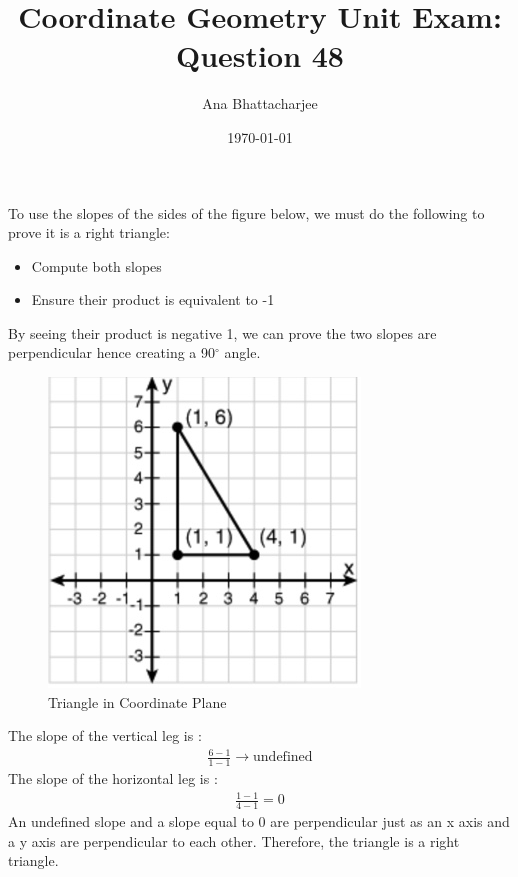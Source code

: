 \documentclass{article}
\begin{document}
\title{Coordinate Geometry Unit Exam: Question 48}
\author{Ana Bhattacharjee}
\date{\today}
\maketitle{}

\begin{center}
To use the slopes of the sides of the figure below, we must do the following to prove it is a right triangle:
\begin{itemize}
  \item Compute both slopes
  \item Ensure their product is equivalent to -1
\end{itemize}
By seeing their product is negative 1, we can prove the two slopes are perpendicular hence creating a 90$^\circ$ angle.
\begin{figure}[!htbp]
  \includegraphics[width=1.0\columnwidth]{triangle}
  \caption{Triangle in Coordinate Plane}
\end{figure}
\par
The slope of the vertical leg is :
\begin{align}
  \frac{6 - 1}{1 - 1} \rightarrow \text{undefined}
\end{align}
The slope of the horizontal leg is :
\begin{align}
  \frac{1 - 1}{4 - 1} = 0
\end{align}
An undefined slope and a slope equal to 0 are perpendicular just as an x axis and a y axis are perpendicular to each other. Therefore, the triangle is a right triangle. 
\end{center}
\end{document}
